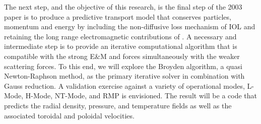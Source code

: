 The next step, and the objective of this research, is the final step of the 2003 paper \cite{Stacey2003}  is to produce a predictive transport model that conserves particles, momentum and energy by including the non-diffusive loss mechanism of \ac{IOL} and retaining the long range electromagnetic contributions of \vxb. A necessary and intermediate step is to provide an iterative computational algorithm that is compatible with the strong E\&M and \vxb forces simultaneously with the weaker scattering forces. To this end, we will explore the Broyden algorithm, a quasi Newton-Raphson method, as the primary iterative solver in combination with Gauss reduction. A validation exercise against a variety of operational modes, \gls{L-Mode}, \gls{H-Mode}, \gls{NT-Mode}, and \ac{RMP} is envisioned. The result will be a code that predicts the radial density, pressure, and temperature fields as well as the associated toroidal and poloidal velocities.
